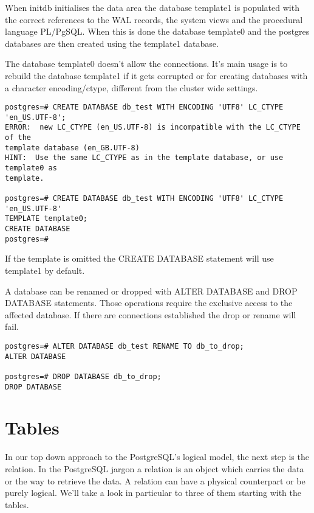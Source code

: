 When initdb initialises the data area the database template1 is populated with the correct
references to the WAL records, the system views and the procedural language PL/PgSQL. When
this is done the database template0 and the postgres databases are then created using the template1
database.

The database template0 doesn't allow the connections. It's main usage is to rebuild the
database template1 if it gets corrupted or for creating databases with a character encoding/ctype, 
different from the cluster wide settings. 

\begin{lstlisting}[style=pgsql]
postgres=# CREATE DATABASE db_test WITH ENCODING 'UTF8' LC_CTYPE 'en_US.UTF-8';
ERROR:  new LC_CTYPE (en_US.UTF-8) is incompatible with the LC_CTYPE of the 
template database (en_GB.UTF-8)
HINT:  Use the same LC_CTYPE as in the template database, or use template0 as 
template.

postgres=# CREATE DATABASE db_test WITH ENCODING 'UTF8' LC_CTYPE 'en_US.UTF-8' 
TEMPLATE template0;
CREATE DATABASE
postgres=# 

\end{lstlisting}

If the template is omitted the CREATE DATABASE statement will use template1 by default. 


A database can be renamed or dropped with ALTER DATABASE and DROP DATABASE  statements. Those operations require the exclusive access to the 
affected database. If there are connections established the drop or rename will fail.

\begin{lstlisting}[style=pgsql]
postgres=# ALTER DATABASE db_test RENAME TO db_to_drop;
ALTER DATABASE

postgres=# DROP DATABASE db_to_drop;
DROP DATABASE

\end{lstlisting}




\section{Tables}
\label{sec:TABLES}
In our top down approach to the PostgreSQL's logical model, the next step is the relation.
In the PostgreSQL jargon a relation is an object which carries the data or the way to
retrieve the data. A relation can have a physical counterpart or be purely logical. We'll take a 
look in particular to three of them starting with the tables.\newline

